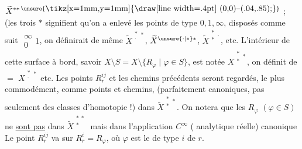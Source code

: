 
$\widetilde{X}^{\substack{*\\*}*\,\unsure{\vcenter{\hbox{\tikz[x=1mm,y=1mm]{\draw[line width=.4pt] (0,0)--(.04,.85);}}}}}$ ; (les trois $*$ signifient qu'on a enlevé  les points de type $0,1,\infty$, disposés comme suit $\substack{\infty\\0}1$, on définirait de même $\widetilde{X}^{\substack{*\\\cdot}*}$, $\widetilde{X}^{\substack{\unsure{\cdot|*}\\*}*}$, $\widetilde{X}^{\substack{*\\*}\cdot}$, etc.  L'intérieur de cette surface à bord, savoir $X\setminus S=X\setminus\{R_\varphi\mid\varphi\in S\}$, est notée $X^{\substack{*\\*}*}$, on définit de $=$ $X^{\substack{*\\\cdot}*}$ etc. Les points $R_r^{ij}$ et les chemins précédents seront regardés, le plus commodément, comme points et chemins, (parfaitement canoniques, pas seulement des classes d'homotopie !) dans $\widetilde{X}^{\substack{*\\*}*}$. On notera que les $R_\varphi$ $(\varphi\in S)$ ne \uline{sont pas} dans $\widetilde{X}^{\substack{*\ *\\*}}$
mais dans l'application $C^\infty$ ( analytique réelle) canonique
Le point $R_r^{ij}$ va sur $R_r^i=R_\varphi$, où $\varphi$ est le   de type $i$ de $r$.

